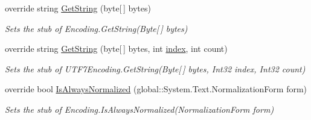 \begin{DoxyCompactItemize}
override string \hyperlink{class_system_1_1_text_1_1_fakes_1_1_stub_u_t_f7_encoding_aff5836174162dfe65ec58bfb7dde06d1}{Get\-String} (byte\mbox{[}$\,$\mbox{]} bytes)
\begin{DoxyCompactList}\small\item\em Sets the stub of Encoding.\-Get\-String(\-Byte\mbox{[}$\,$\mbox{]} bytes)\end{DoxyCompactList}\item 
override string \hyperlink{class_system_1_1_text_1_1_fakes_1_1_stub_u_t_f7_encoding_a0f9adcbc9a130ac472860c24c0164731}{Get\-String} (byte\mbox{[}$\,$\mbox{]} bytes, int \hyperlink{jquery-1_810_82-vsdoc_8js_a75bb12d1f23302a9eea93a6d89d0193e}{index}, int count)
\begin{DoxyCompactList}\small\item\em Sets the stub of U\-T\-F7\-Encoding.\-Get\-String(\-Byte\mbox{[}$\,$\mbox{]} bytes, Int32 index, Int32 count)\end{DoxyCompactList}\item 
override bool \hyperlink{class_system_1_1_text_1_1_fakes_1_1_stub_u_t_f7_encoding_ab35de82e9eef023a90b5a2c4b0599df4}{Is\-Always\-Normalized} (global\-::\-System.\-Text.\-Normalization\-Form form)
\begin{DoxyCompactList}\small\item\em Sets the stub of Encoding.\-Is\-Always\-Normalized(\-Normalization\-Form form)\end{DoxyCompactList}\end{DoxyCompactItemize}

